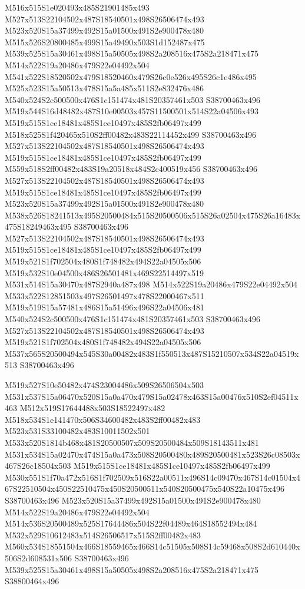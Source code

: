 \documentclass{article}
\begin{document}
\begin{multicols}{2}
M516x515S1e020493x485S21901485x493 M527x513S22104502x487S18540501x498S26506474x493 M523x520S15a37499x492S15a01500x491S2e900478x480 M515x526S20800485x499S15a49490x503S1d152487x475 M539x525S15a30461x498S15a50505x498S2a208516x475S2a218471x475 M514x522S19a20486x479S22e04492x504 M541x522S18520502x479S18520460x479S26c0e526x495S26c1e486x495 M525x523S15a50513x478S15a5a485x511S2e832476x486 M540x524S2c500500x476S1c151474x481S20357461x503 S38700463x496 M519x544S16d48482x487S10e00503x457S11500501x514S22a04506x493 M519x515S1ce18481x485S1ce10497x485S2fb06497x499 M518x525S1f420465x510S2ff00482x483S22114452x499 S38700463x496 M527x513S22104502x487S18540501x498S26506474x493 M519x515S1ce18481x485S1ce10497x485S2fb06497x499 M559x518S2ff00482x483S19a20518x484S2c400519x456 S38700463x496 M527x513S22104502x487S18540501x498S26506474x493 M519x515S1ce18481x485S1ce10497x485S2fb06497x499 M523x520S15a37499x492S15a01500x491S2e900478x480 M538x526S18241513x495S20500484x515S20500506x515S26a02504x475S26a16483x475S18249463x495 S38700463x496 M527x513S22104502x487S18540501x498S26506474x493 M519x515S1ce18481x485S1ce10497x485S2fb06497x499 M519x521S1f702504x480S1f748482x494S22a04505x506 M519x532S10e04500x486S26501481x469S22514497x519 M531x514S15a30470x487S2940a487x498 M514x522S19a20486x479S22e04492x504 M533x522S12851503x497S26501497x478S22000467x511 M519x519S15a57481x486S15a51496x496S22a04506x481 M540x524S2c500500x476S1c151474x481S20357461x503 S38700463x496 M527x513S22104502x487S18540501x498S26506474x493 M519x521S1f702504x480S1f748482x494S22a04505x506 M537x565S20500494x545S30a00482x483S1f550513x487S15210507x534S22a04519x513 S38700463x496

M519x527S10e50482x474S23004486x509S26506504x503 M531x537S15a06470x520S15a0a470x479S15a02478x463S15a00476x510S2ef04511x463 M512x519S17644488x503S18522497x482 M518x534S1e141470x506S34600482x483S2ff00482x483 M523x531S33100482x483S10011502x501 M533x520S1814b468x481S20500507x509S20500484x509S18143511x481 M531x534S15a02470x474S15a0a473x508S20500480x489S20500481x523S26c08503x467S26c18504x503 M519x515S1ce18481x485S1ce10497x485S2fb06497x499 M530x551S1f70a472x516S1f702509x516S22a00511x496S14c09470x467S14c01504x467S22510504x450S22510475x450S20500511x540S20500475x540S22a10475x496 S38700463x496 M523x520S15a37499x492S15a01500x491S2e900478x480 M514x522S19a20486x479S22e04492x504 M514x536S20500489x525S17644486x504S22f04489x464S18552494x484 M532x529S10612483x514S26506517x515S2ff00482x483 M560x534S18551504x466S18559465x466S14c51505x508S14c59468x508S2d610440x506S2d608531x506 S38700463x496 M539x525S15a30461x498S15a50505x498S2a208516x475S2a218471x475 S38800464x496


\end{multicols}
\end{document}
